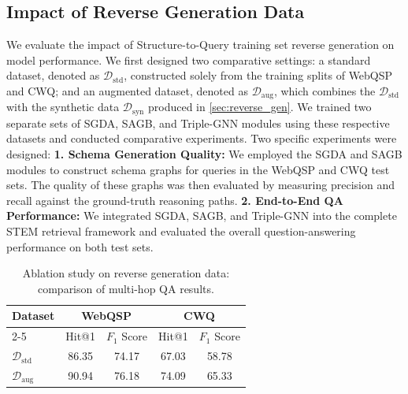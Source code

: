 \documentclass[11pt]{article}
\begin{document}
\subsection{Impact of Reverse Generation Data}
We evaluate the impact of Structure-to-Query training set reverse generation on model performance. We first designed two comparative settings: a standard dataset, denoted as $\mathcal{D}_\text{std}$, constructed solely from the training splits of WebQSP and CWQ; and an augmented dataset, denoted as $\mathcal{D}_\text{aug}$, which combines the $\mathcal{D}_\text{std}$ with the synthetic data $\mathcal{D}_\text{syn}$ produced in \ref{sec:reverse_gen}. We trained two separate sets of SGDA, SAGB, and Triple-GNN modules using these respective datasets and conducted comparative experiments. Two specific experiments were designed: \textbf{1. Schema Generation Quality:} We employed the SGDA and SAGB modules to construct schema graphs for queries in the WebQSP and CWQ test sets. The quality of these graphs was then evaluated by measuring precision and recall against the ground-truth reasoning paths. \textbf{2. End-to-End QA Performance:} We integrated SGDA, SAGB, and Triple-GNN into the complete STEM retrieval framework and evaluated the overall question-answering performance on both test sets.

\begin{table}[t]
\centering
\footnotesize
\renewcommand{\arraystretch}{1.15}
\setlength{\tabcolsep}{2.5pt} 

\begin{tabular}{l|cc|cc}
\toprule
\hline
\multirow{2}{*}{\textbf{Dataset}} & 
\multicolumn{2}{c|}{\textbf{WebQSP}} & 
\multicolumn{2}{c}{\textbf{CWQ}} \\ \cline{2-5} 

& Hit@1  & $F_1$ Score  & Hit@1 & $F_1$ Score \\ 

\hline
$\mathcal{D}_{\text{std}}$ & 86.35 & 74.17 & 67.03 & 58.78 \\
$\mathcal{D}_{\text{aug}}$ & 90.94 & 76.18 & 74.09 & 65.33 \\
\hline
\bottomrule
\end{tabular}
\caption{Ablation study on reverse generation data: comparison of multi-hop QA results.}
\label{tab:e2e_QA}
\end{table}
\end{document}
